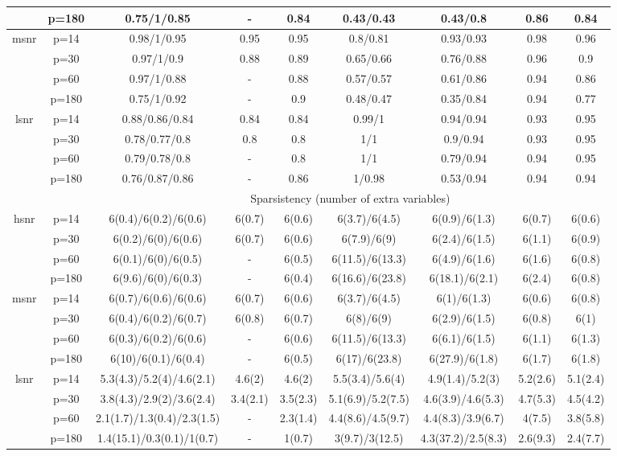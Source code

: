 \begin{table}[ht]
{\begin{tabular}{|c|c|ccccccc|}
   & p=180 & 0.75/1/0.85 & - & 0.84 & 0.43/0.43 & 0.43/0.8 & 0.86 & 0.84 \\ 
  \midrule\multirow{4}[2]{*}{msnr} & p=14 & 0.98/1/0.95 & 0.95 & 0.95 & 0.8/0.81 & 0.93/0.93 & 0.98 & 0.96 \\ 
   & p=30 & 0.97/1/0.9 & 0.88 & 0.89 & 0.65/0.66 & 0.76/0.88 & 0.96 & 0.9 \\ 
   & p=60 & 0.97/1/0.88 & - & 0.88 & 0.57/0.57 & 0.61/0.86 & 0.94 & 0.86 \\ 
   & p=180 & 0.75/1/0.92 & - & 0.9 & 0.48/0.47 & 0.35/0.84 & 0.94 & 0.77 \\ 
  \midrule\multirow{4}[2]{*}{lsnr} & p=14 & 0.88/0.86/0.84 & 0.84 & 0.84 & 0.99/1 & 0.94/0.94 & 0.93 & 0.95 \\ 
   & p=30 & 0.78/0.77/0.8 & 0.8 & 0.8 & 1/1 & 0.9/0.94 & 0.93 & 0.95 \\ 
   & p=60 & 0.79/0.78/0.8 & - & 0.8 & 1/1 & 0.79/0.94 & 0.94 & 0.95 \\ 
   & p=180 & 0.76/0.87/0.86 & - & 0.86 & 1/0.98 & 0.53/0.94 & 0.94 & 0.94 \\ 
   \midrule 
 \multicolumn{1}{|c}{} &       & \multicolumn{7}{c|}{Sparsistency (number of extra variables)} \\
\midrule\multirow{4}[2]{*}{hsnr} & p=14 & 6(0.4)/6(0.2)/6(0.6) & 6(0.7) & 6(0.6) & 6(3.7)/6(4.5) & 6(0.9)/6(1.3) & 6(0.7) & 6(0.6) \\ 
   & p=30 & 6(0.2)/6(0)/6(0.6) & 6(0.7) & 6(0.6) & 6(7.9)/6(9) & 6(2.4)/6(1.5) & 6(1.1) & 6(0.9) \\ 
   & p=60 & 6(0.1)/6(0)/6(0.5) & - & 6(0.5) & 6(11.5)/6(13.3) & 6(4.9)/6(1.6) & 6(1.6) & 6(0.8) \\ 
   & p=180 & 6(9.6)/6(0)/6(0.3) & - & 6(0.4) & 6(16.6)/6(23.8) & 6(18.1)/6(2.1) & 6(2.4) & 6(0.8) \\ 
  \midrule\multirow{4}[2]{*}{msnr} & p=14 & 6(0.7)/6(0.6)/6(0.6) & 6(0.7) & 6(0.6) & 6(3.7)/6(4.5) & 6(1)/6(1.3) & 6(0.6) & 6(0.8) \\ 
   & p=30 & 6(0.4)/6(0.2)/6(0.7) & 6(0.8) & 6(0.7) & 6(8)/6(9) & 6(2.9)/6(1.5) & 6(0.8) & 6(1) \\ 
   & p=60 & 6(0.3)/6(0.2)/6(0.6) & - & 6(0.6) & 6(11.5)/6(13.3) & 6(6.1)/6(1.5) & 6(1.1) & 6(1.3) \\ 
   & p=180 & 6(10)/6(0.1)/6(0.4) & - & 6(0.5) & 6(17)/6(23.8) & 6(27.9)/6(1.8) & 6(1.7) & 6(1.8) \\ 
  \midrule\multirow{4}[2]{*}{lsnr} & p=14 & 5.3(4.3)/5.2(4)/4.6(2.1) & 4.6(2) & 4.6(2) & 5.5(3.4)/5.6(4) & 4.9(1.4)/5.2(3) & 5.2(2.6) & 5.1(2.4) \\ 
   & p=30 & 3.8(4.3)/2.9(2)/3.6(2.4) & 3.4(2.1) & 3.5(2.3) & 5.1(6.9)/5.2(7.5) & 4.6(3.9)/4.6(5.3) & 4.7(5.3) & 4.5(4.2) \\ 
   & p=60 & 2.1(1.7)/1.3(0.4)/2.3(1.5) & - & 2.3(1.4) & 4.4(8.6)/4.5(9.7) & 4.4(8.3)/3.9(6.7) & 4(7.5) & 3.8(5.8) \\ 
   & p=180 & 1.4(15.1)/0.3(0.1)/1(0.7) & - & 1(0.7) & 3(9.7)/3(12.5) & 4.3(37.2)/2.5(8.3) & 2.6(9.3) & 2.4(7.7) \\ 
   \bottomrule 
\end{tabular}
}
\end{table}
